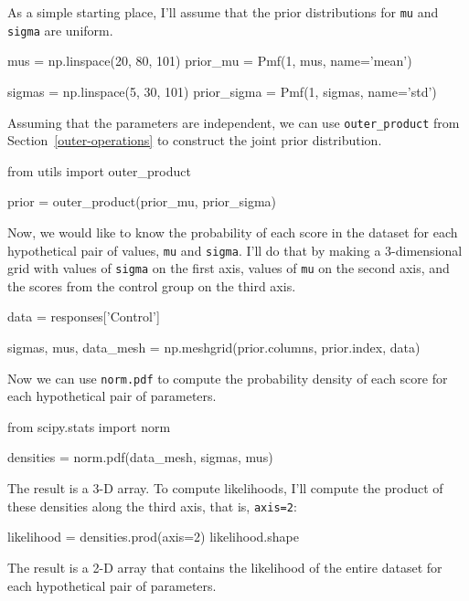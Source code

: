\documentclass[12pt]{book}
\theoremstyle{exercise}
\newcommand{\py}[1]{{\tt #1}}%
\begin{document}
As a simple starting place, I'll assume that the prior distributions for
\py{mu} and \py{sigma} are
uniform.

\begin{code}
mus = np.linspace(20, 80, 101)
prior_mu = Pmf(1, mus, name='mean')

sigmas = np.linspace(5, 30, 101)
prior_sigma = Pmf(1, sigmas, name='std')
\end{code}

Assuming that the parameters are independent, we can use \py{outer_product} from Section~\ref{outer-operations} to construct the joint prior distribution.

\begin{code}
from utils import outer_product

prior = outer_product(prior_mu, prior_sigma)
\end{code}

Now, we would like to know the probability of each score in the dataset
for each hypothetical pair of values, \py{mu} and
\py{sigma}. I'll do that by making a 3-dimensional
grid with values of \py{sigma} on the first axis,
values of \py{mu} on the second axis, and the
scores from the control group on the third axis.

\begin{code}
data = responses['Control']

sigmas, mus, data_mesh = np.meshgrid(prior.columns,
                                     prior.index,
                                     data)
\end{code}

Now we can use \py{norm.pdf} to compute the
probability density of each score for each hypothetical pair of
parameters.

\begin{code}
from scipy.stats import norm

densities = norm.pdf(data_mesh, sigmas, mus)
\end{code}

The result is a 3-D array. To compute likelihoods, I'll compute the
product of these densities along the third axis, that is,
\py{axis=2}:

\begin{code}
likelihood = densities.prod(axis=2)
likelihood.shape
\end{code}

The result is a 2-D array that contains the likelihood of the entire
dataset for each hypothetical pair of parameters.
\end{document}
